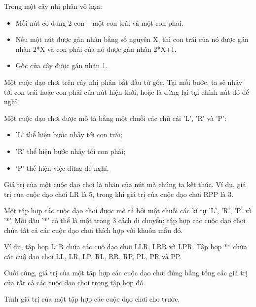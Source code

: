 Trong một cây nhị phân vô hạn:  
\begin{itemize}
	\item     Mỗi nút có đúng 2 con – một con trái và một con phải.   
	\item     Nếu một nút được gán nhãn bằng số nguyên X, thì con trái của nó được gán nhãn 2*X và con phải của nó được gán nhãn 2*X+1.   
	\item     Gốc của cây được gán nhãn 1.   
\end{itemize}

   Một  cuộc dạo chơi trên cây nhị phân bắt đầu từ gốc. Tại mỗi bước, ta sẽ nhảy tới con trái hoặc con phải của nút hiện thời, hoặc là dừng lại tại chính nút đó để nghỉ.  

   Một cuộc dạo chơi được mô tả bằng một chuỗi các chữ cái 'L', 'R' và 'P':  
\begin{itemize}
	\item     'L' thể hiện bước nhảy tới con trái;   
	\item     'R' thể hiện bước nhảy tới con phải;   
	\item     'P' thể hiện việc dừng để nghỉ.   
\end{itemize}

   Giá trị của một cuộc dạo chơi là nhãn của nút mà chúng ta kết thúc. Ví dụ, giá trị của cuộc dạo chơi LR là 5, trong khi giá trị của cuộc dạo chơi RPP là 3.  

   Một tập hợp các cuộc dạo chơi được mô tả bởi một chuỗi các kí tự 'L', 'R', 'P' và '*'. Mỗi dấu '*' có thể là một trong 3 cách di chuyển; tập hợp các cuộc dạo chơi chứa tất cả các cuộc dạo chơi thích hợp với khuôn mẫu đó.  

   Ví dụ, tập hợp L*R chứa các cuộ dạo chơi LLR, LRR và LPR. Tập hợp ** chứa các cuộ dạo chơi LL, LR, LP, RL, RR, RP, PL, PR và PP.  

   Cuối cùng, giá trị của một tập hợp các cuộc dạo chơi đúng bằng tổng các giá trị của tất cả các cuộc dạo chơi trong tập hợp đó.  

   Tính giá trị của một tập hợp các cuộc dạo chơi cho trước.  

\